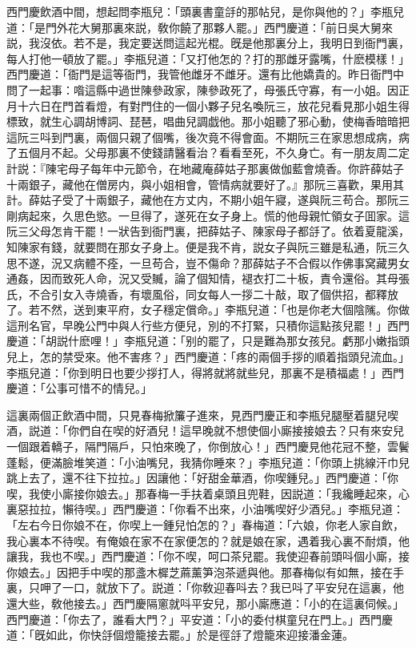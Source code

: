 西門慶飲酒中間，想起問李瓶兒：「頭裏書童㧱的那帖兒，是你與他的？」李瓶兒道：「是門外花大舅那裏來説，敎你饒了那夥人罷。」西門慶道：「前日吳大舅來説，我沒依。若不是，我定要送問這起光棍。旣是他那裏分上，我明日到衙門裏，每人打他一頓放了罷。」李瓶兒道：「又打他怎的？打的那雌牙露嘴，什麽模樣！」西門慶道：「衙門是這等衙門，我管他雌牙不雌牙。還有比他嬌貴的。昨日衙門中問了一起事：喒這縣中過世陳參政家，陳參政死了，母張氏守寡，有一小姐。因正月十六日在門首看燈，有對門住的一個小夥子兒名喚阮三，放花兒看見那小姐生得標致，就生心調胡博詞、琵琶，唱曲兒調戯他。那小姐聽了邪心動，使梅香暗暗把這阮三呌到門裏，兩個只親了個嘴，後次竟不得會面。不期阮三在家思想成病，病了五個月不起。父母那裏不使錢請醫看治？看看至死，不久身亡。有一朋友周二定計説：『陳宅母子每年中元節令，在地藏庵薛姑子那裏做伽藍會燒香。你許薛姑子十兩銀子，藏他在僧房内，與小姐相會，管情病就要好了。』那阮三喜歡，果用其計。薛姑子受了十兩銀子，藏他在方丈内，不期小姐午寢，遂與阮三苟合。那阮三剛病起來，久思色慾。一旦得了，遂死在女子身上。慌的他母親忙領女子囬家。這阮三父母怎肯干罷！一狀告到衙門裏，把薛姑子、陳家母子都㧱了。依着夏龍溪，知陳家有錢，就要問在那女子身上。便是我不肯，説女子與阮三雖是私通，阮三久思不遂，況又病體不痊，一旦苟合，豈不傷命？那薛姑子不合假以作佛事窝藏男女通姦，因而致死人命，況又受贓，論了個知情，褪衣打二十板，責令還俗。其母張氏，不合引女入寺燒香，有壞風俗，同女每人一拶二十敲，取了個供招，都釋放了。若不然，送到東平府，女子穩定償命。」李瓶兒道：「也是你老大個陰隲。你做這刑名官，早晚公門中與人行些方便兒，別的不打緊，只積你這點孩兒罷！」西門慶道：「胡説什麽哩！」李瓶兒道：「别的罷了，只是難為那女孩兒。虧那小嫩指頭兒上，怎的禁受來。他不害疼？」西門慶道：「疼的兩個手拶的順着指頭兒流血。」李瓶兒道：「你到明日也要少拶打人，得將就將就些兒，那裏不是積福處！」西門慶道：「公事可惜不的情兒。」

這裏兩個正飲酒中間，只見春梅掀簾子進來，見西門慶正和李瓶兒腿壓着腿兒喫酒，説道：「你們自在喫的好酒兒！這早晚就不想使個小廝接接娘去？只有來安兒一個跟着轎子，隔門隔戶，只怕來晚了，你倒放心！」西門慶見他花冠不整，雲鬢蓬鬆，便滿臉堆笑道：「小油嘴兒，我猜你睡來？」李瓶兒道：「你頭上挑線汗巾兒跳上去了，還不往下拉拉。」因讓他：「好甜金華酒，你喫鍾兒。」西門慶道：「你喫，我使小廝接你娘去。」那春梅一手扶着桌頭且兜鞋，因説道：「我纔睡起來，心裏惡拉拉，懶待喫。」西門慶道：「你看不出來，小油嘴喫好少酒兒。」李瓶兒道：「左右今日你娘不在，你喫上一鍾兒怕怎的？」春梅道：「六娘，你老人家自飲，我心裏本不待喫。有俺娘在家不在家便怎的？就是娘在家，遇着我心裏不耐煩，他讓我，我也不喫。」西門慶道：「你不喫，呵口茶兒罷。我使迎春前頭呌個小廝，接你娘去。」因把手中喫的那盞木樨芝蔴薰笋泡茶遞與他。那春梅似有如無，接在手裏，只呷了一口，就放下了。説道：「你敎迎春呌去？我已呌了平安兒在這裏，他還大些，敎他接去。」西門慶隔窻就呌平安兒，那小廝應道：「小的在這裏伺候。」西門慶道：「你去了，誰看大門？」平安道：「小的委付棋童兒在門上。」西門慶道：「旣如此，你快㧱個燈籠接去罷。」於是徑㧱了燈籠來迎接潘金蓮。

